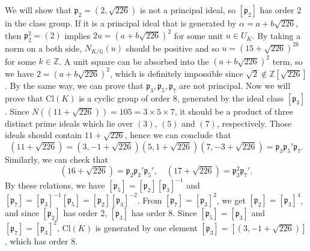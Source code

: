 \documentclass{article}
\newcommand{\Cl}{\mathrm{Cl}}
\begin{document}
We will show that $\mathfrak{p}_{2} = (2, \sqrt{226})$ is not a principal ideal, so $[\mathfrak{p}_{2}]$ has order 2 in the class group. If it is a principal ideal that is generated by $\alpha = a+b\sqrt{226}$, then $\mathfrak{p}_{2}^{2} = (2)$ implies $2u = (a+b\sqrt{226})^{2}$ for some unit $u\in U_{K}$. By taking a norm on a both side, $N_{K/\mathbb{Q}}(u)$ should be positive and so $u = (15+\sqrt{226})^{2k}$ for some $k\in \mathbb{Z}$. A unit square can be absorbed into the $(a+b\sqrt{226})^{2}$ term, so we have $2 = (a+b\sqrt{226})^{2}$, which is definitely impossible since $\sqrt{2}\not\in \mathbb{Z}[\sqrt{226}]$.  By the same way, we can prove that $\mathfrak{p}_{3}, \mathfrak{p}_{5}, \mathfrak{p}_{7}$ are not principal. 
Now we will prove that $\Cl(K)$ is a cyclic group of order 8, generated by the ideal class $[\mathfrak{p}_{3}]$. 
Since $N((11+\sqrt{226})) = 105 = 3\times 5\times 7$, it should be a product of three distinct prime ideals which lie over $(3)$, $(5)$ and $(7)$, respectively. Those ideals should contain $11+\sqrt{226}$, hence we can conclude that 
$$
(11+\sqrt{226}) = (3, -1 + \sqrt{226})(5, 1+\sqrt{226})(7, -3+\sqrt{226}) = \mathfrak{p}_{3}\mathfrak{p}_{5}'\mathfrak{p}_{7}. 
$$
Similarly, we can check that 
$$
(16+\sqrt{226}) = \mathfrak{p}_{2}\mathfrak{p}_{3}'\mathfrak{p}_{5}', \quad (17+\sqrt{226}) = \mathfrak{p}_{3}^{2}\mathfrak{p}_{7}'. 
$$
By these relations, we have $[\mathfrak{p}_{5}]= [\mathfrak{p}_{2}][\mathfrak{p}_{3}]^{-1}$ and $[\mathfrak{p}_{7}] = [\mathfrak{p}_{3}]^{-1}[\mathfrak{p}_{5}] = [\mathfrak{p}_{2}][\mathfrak{p}_{3}]^{-2}$. 
From $[\mathfrak{p}_{7}] = [\mathfrak{p}_{3}]^{2}$, we get $[\mathfrak{p}_{2}] = [\mathfrak{p}_{3}]^{4}$, and since $[\mathfrak{p}_{2}]$ has order 2, $[\mathfrak{p}_{3}]$ has order 8. Since $[\mathfrak{p}_{5}] = [\mathfrak{p}_{3}]$ and $[\mathfrak{p}_{7}] = [\mathfrak{p}_{3}]^{2}$, $\Cl(K)$ is generated by one element $[\mathfrak{p}_{3}] = [(3, -1+\sqrt{226})]$, which has order 8. 
\end{document}

